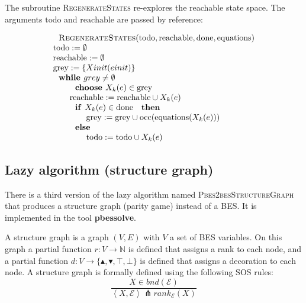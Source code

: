 The subroutine \textsc{RegenerateStates} re-explores the reachable state
space. The arguments $\mathrm{todo}$ and $\mathrm{reachable}$ are passed by
reference:

\begin{equation*}
\begin{array}{l}
\text{\textsc{RegenerateStates}}(\mathrm{todo},\mathrm{reachable},\mathrm{%
done},\mathrm{equations}) \\ 
\mathrm{todo}:=\emptyset  \\ 
\mathrm{reachable}:=\emptyset  \\ 
\mathrm{grey}:=\{Xinit(einit)\} \\ 
\text{\textbf{while }}grey\neq \emptyset  \\ 
\qquad \text{\textbf{choose }}X_{k}(e)\in \mathrm{grey} \\ 
\qquad \mathrm{reachable}:=\mathrm{reachable}\cup X_{k}(e) \\ 
\qquad \text{\textbf{if }}X_{k}(e)\in \mathrm{done}\text{ \textbf{then }} \\ 
\qquad \qquad \mathrm{grey}:=\mathrm{grey}\cup \mathrm{occ}(\mathrm{equations%
}(X_{k}(e))) \\ 
\qquad \text{\textbf{else }} \\ 
\qquad \qquad \mathrm{todo}:=\mathrm{todo}\cup X_{k}(e)%
\end{array}%
\end{equation*}%
\newpage 

\subsection{Lazy algorithm (structure graph)}

There is a third version of the lazy algorithm named \textsc{%
Pbes2besStructureGraph} that produces a structure graph (parity game)
instead of a BES. It is implemented in the tool \textbf{pbessolve}.

A structure graph is a graph $(V,E)$ with $V$ a set of BES variables. On
this graph a partial function $r:V\rightarrow \mathbb{N}$ is defined that
assigns a rank to each node, and a partial function $d:V\rightarrow
\{\blacktriangle ,\blacktriangledown ,\top ,\bot \}$ is defined that assigns
a decoration to each node. A structure graph is formally defined using the
following SOS rules:%
\begin{equation*}
\frac{X\in bnd(\mathcal{E})}{\left\langle X,\mathcal{E}\right\rangle
\pitchfork rank_{\mathcal{E}}(X)}
\end{equation*}

